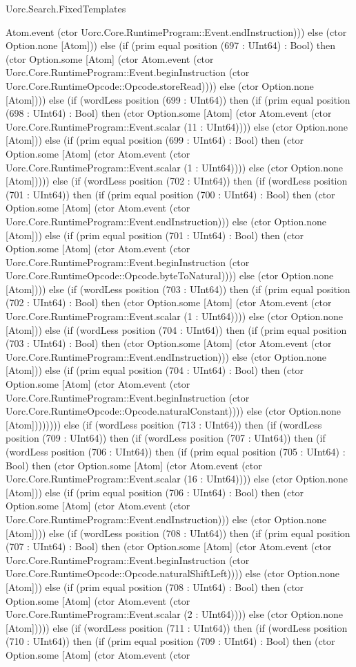 \begin{lexlean}{Uorc.Search.FixedTemplates}
\begin{semanticmodule}
{Atom.event (ctor Uorc.Core.RuntimeProgram::Event.endInstruction))) else (ctor Option.none [Atom])) else (if (prim equal position (697 : UInt64) : Bool) then (ctor Option.some [Atom] (ctor Atom.event (ctor Uorc.Core.RuntimeProgram::Event.beginInstruction (ctor Uorc.Core.RuntimeOpcode::Opcode.storeRead)))) else (ctor Option.none [Atom]))) else (if (wordLess position (699 : UInt64)) then (if (prim equal position (698 : UInt64) : Bool) then (ctor Option.some [Atom] (ctor Atom.event (ctor Uorc.Core.RuntimeProgram::Event.scalar (11 : UInt64)))) else (ctor Option.none [Atom])) else (if (prim equal position (699 : UInt64) : Bool) then (ctor Option.some [Atom] (ctor Atom.event (ctor Uorc.Core.RuntimeProgram::Event.scalar (1 : UInt64)))) else (ctor Option.none [Atom])))) else (if (wordLess position (702 : UInt64)) then (if (wordLess position (701 : UInt64)) then (if (prim equal position (700 : UInt64) : Bool) then (ctor Option.some [Atom] (ctor Atom.event (ctor Uorc.Core.RuntimeProgram::Event.endInstruction))) else (ctor Option.none [Atom])) else (if (prim equal position (701 : UInt64) : Bool) then (ctor Option.some [Atom] (ctor Atom.event (ctor Uorc.Core.RuntimeProgram::Event.beginInstruction (ctor Uorc.Core.RuntimeOpcode::Opcode.byteToNatural)))) else (ctor Option.none [Atom]))) else (if (wordLess position (703 : UInt64)) then (if (prim equal position (702 : UInt64) : Bool) then (ctor Option.some [Atom] (ctor Atom.event (ctor Uorc.Core.RuntimeProgram::Event.scalar (1 : UInt64)))) else (ctor Option.none [Atom])) else (if (wordLess position (704 : UInt64)) then (if (prim equal position (703 : UInt64) : Bool) then (ctor Option.some [Atom] (ctor Atom.event (ctor Uorc.Core.RuntimeProgram::Event.endInstruction))) else (ctor Option.none [Atom])) else (if (prim equal position (704 : UInt64) : Bool) then (ctor Option.some [Atom] (ctor Atom.event (ctor Uorc.Core.RuntimeProgram::Event.beginInstruction (ctor Uorc.Core.RuntimeOpcode::Opcode.naturalConstant)))) else (ctor Option.none [Atom]))))))) else (if (wordLess position (713 : UInt64)) then (if (wordLess position (709 : UInt64)) then (if (wordLess position (707 : UInt64)) then (if (wordLess position (706 : UInt64)) then (if (prim equal position (705 : UInt64) : Bool) then (ctor Option.some [Atom] (ctor Atom.event (ctor Uorc.Core.RuntimeProgram::Event.scalar (16 : UInt64)))) else (ctor Option.none [Atom])) else (if (prim equal position (706 : UInt64) : Bool) then (ctor Option.some [Atom] (ctor Atom.event (ctor Uorc.Core.RuntimeProgram::Event.endInstruction))) else (ctor Option.none [Atom]))) else (if (wordLess position (708 : UInt64)) then (if (prim equal position (707 : UInt64) : Bool) then (ctor Option.some [Atom] (ctor Atom.event (ctor Uorc.Core.RuntimeProgram::Event.beginInstruction (ctor Uorc.Core.RuntimeOpcode::Opcode.naturalShiftLeft)))) else (ctor Option.none [Atom])) else (if (prim equal position (708 : UInt64) : Bool) then (ctor Option.some [Atom] (ctor Atom.event (ctor Uorc.Core.RuntimeProgram::Event.scalar (2 : UInt64)))) else (ctor Option.none [Atom])))) else (if (wordLess position (711 : UInt64)) then (if (wordLess position (710 : UInt64)) then (if (prim equal position (709 : UInt64) : Bool) then (ctor Option.some [Atom] (ctor Atom.event (ctor }
\end{semanticmodule}
\end{lexlean}
